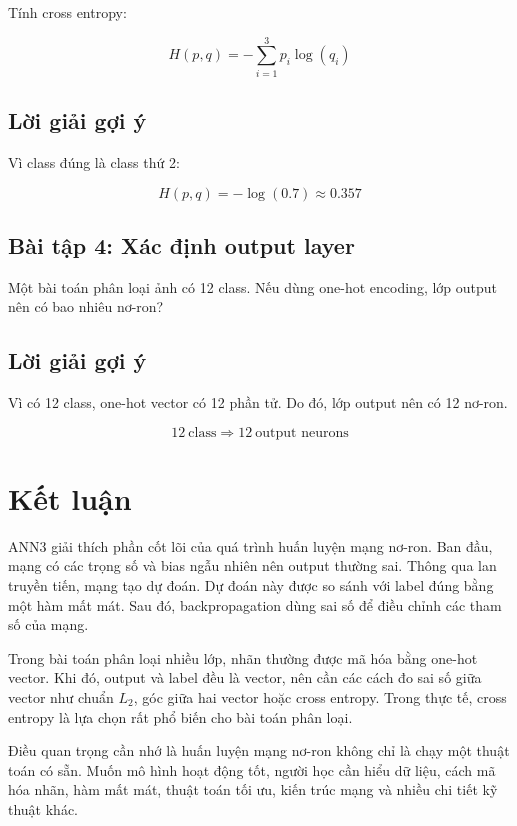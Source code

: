 Tính cross entropy:

\[
    H(p,q)=-\sum_{i=1}^{3}p_i\log(q_i)
\]

\subsection*{Lời giải gợi ý}

Vì class đúng là class thứ 2:

\[
    H(p,q)=-\log(0.7)\approx 0.357
\]

\subsection*{Bài tập 4: Xác định output layer}

Một bài toán phân loại ảnh có 12 class. Nếu dùng one-hot encoding, lớp output nên có bao nhiêu nơ-ron?

\subsection*{Lời giải gợi ý}

Vì có 12 class, one-hot vector có 12 phần tử. Do đó, lớp output nên có 12 nơ-ron.

\[
    12\ \text{class} \Rightarrow 12\ \text{output neurons}
\]

\section*{Kết luận}

ANN3 giải thích phần cốt lõi của quá trình huấn luyện mạng nơ-ron. Ban đầu, mạng có các trọng số và bias ngẫu nhiên nên output thường sai. Thông qua lan truyền tiến, mạng tạo dự đoán. Dự đoán này được so sánh với label đúng bằng một hàm mất mát. Sau đó, backpropagation dùng sai số để điều chỉnh các tham số của mạng.

Trong bài toán phân loại nhiều lớp, nhãn thường được mã hóa bằng one-hot vector. Khi đó, output và label đều là vector, nên cần các cách đo sai số giữa vector như chuẩn $L_2$, góc giữa hai vector hoặc cross entropy. Trong thực tế, cross entropy là lựa chọn rất phổ biến cho bài toán phân loại.

Điều quan trọng cần nhớ là huấn luyện mạng nơ-ron không chỉ là chạy một thuật toán có sẵn. Muốn mô hình hoạt động tốt, người học cần hiểu dữ liệu, cách mã hóa nhãn, hàm mất mát, thuật toán tối ưu, kiến trúc mạng và nhiều chi tiết kỹ thuật khác.

